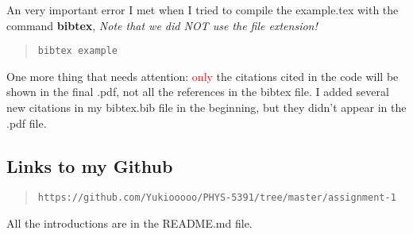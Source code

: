 \documentclass[12pt, letterpaper]{article} %
\begin{document}
An very important error I met when I tried to compile the example.tex with 
the command \textbf{bibtex}, \emph{Note that we did NOT use the file extension!}  
\begin{quote}  %
\begin{verbatim}
bibtex example
\end{verbatim} %
\end{quote} %

One more thing that needs attention: \textcolor{red}{only} the citations 
cited in the code will be shown in the final .pdf, not all the references 
in the bibtex file. I added several new citations in my bibtex.bib file in 
the beginning, but they didn't appear in the .pdf file.

\subsection{Links to my Github} %

\begin{quote} 
\begin{verbatim}
https://github.com/Yukiooooo/PHYS-5391/tree/master/assignment-1
\end{verbatim} %
\end{quote} %

All the introductions are in the README.md file. 





\clearpage %

\end{document}
